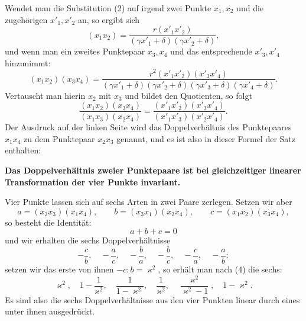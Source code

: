 \documentclass[11pt]{article}
\begin{document}
Wendet man die Substitution (2) auf irgend zwei Punkte $x_1,x_2$ und die zugehörigen $x'_1,x'_2$ an, so ergibt sich
\[
(x_1x_2)=\frac{r(x'_1x'_2)}{(\gamma x'_1+\delta)(\gamma x'_2+\delta)},
\]
und wenn man ein zweites Punktepaar $x_3,x_4$ und das entsprechende $x'_3,x'_4$ hinzunimmt:
\[
(x_1x_2)(x_3x_4)=\frac{r^2(x'_1x'_2)(x'_3x'_4)}{(\gamma x'_1+\delta)(\gamma x'_2+\delta)(\gamma x'_3+\delta)(\gamma x'_4+\delta)}.
\]
Vertauscht man hierin $x_2$ mit $x_3$ und bildet den Quotienten, so folgt
\begin{equation}
\frac{(x_1x_2)(x_3x_4)}{(x_1x_3)(x_2x_4)}=\frac{(x'_1x'_2)(x'_3x'_4)}{(x'_1x'_3)(x'_2x'_4)}.
\tag{3}
\end{equation}
Der Ausdruck auf der linken Seite wird das Doppelverhältnis des Punktepaares $x_1x_4$ zu dem Punktepaar $x_2x_3$ genannt, und es ist also in dieser Formel der Satz enthalten:

\begin{center}
\textbf{Das Doppelverhältnis zweier Punktepaare ist bei gleichzeitiger linearer Transformation der vier Punkte invariant.}
\end{center}

Vier Punkte lassen sich auf sechs Arten in zwei Paare zerlegen. Setzen wir aber
\[
a=(x_2x_3)(x_1x_4),\qquad b=(x_3x_1)(x_2x_4),\qquad c=(x_1x_2)(x_3x_4),
\]
so besteht die Identität:
\begin{equation}
a+b+c=0
\tag{4}
\end{equation}
und wir erhalten die sechs Doppelverhältnisse
\begin{equation}
-\frac{c}{b},\quad -\frac{a}{c},\quad -\frac{b}{a},\quad -\frac{b}{c},\quad -\frac{c}{a},\quad -\frac{a}{b};
\tag{5}
\end{equation}
setzen wir das erste von ihnen $-c:b=\varkappa^2$, so erhält man nach (4) die sechs:
\begin{equation}
\varkappa^2,\quad 1-\frac1{\varkappa^2},\quad \frac1{1-\varkappa^2},\quad \frac1{\varkappa^2},\quad \frac{\varkappa^2}{\varkappa^2-1},\quad 1-\varkappa^2.
\tag{6}
\end{equation}
Es sind also die sechs Doppelverhältnisse aus den vier Punkten linear durch eines unter ihnen ausgedrückt.
\end{document}
